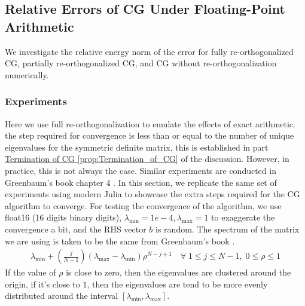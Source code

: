 \documentclass[]{article}
\theoremstyle{definition}
\begin{document}
    \subsection{Relative Errors of CG Under Floating-Point Arithmetic}
        We investigate the relative energy norm of the error for fully re-orthogonalized CG, partially re-orthogonalized CG, and CG without re-orthogonalization numerically. 
        \subsubsection{Experiments}
        Here we use full re-orthogonalization to emulate the effects of exact arithmetic. the step required for convergence is less than or equal to the number of unique eigenvalues for the symmetric definite matrix, this is established in part \hyperref[prop:Termination_of_CG]{Termination of CG \ref*{prop:Termination_of_CG}} of the discussion. However, in practice, this is not always the case. Similar experiments are conducted in Greenbaum's book chapter 4 \cite{book:greenbaum}. In this section, we replicate the same set of experiments using modern Julia to showcase the extra steps required for the CG algorithm to converge. For testing the convergence of the algorithm, we use float16 (16 digits binary digits), $\lambda_{\min} = 1e-4, \lambda_{\max} = 1$ to exaggerate the convergence a bit, and the RHS vector $b$ is random. The spectrum of the matrix we are using is taken to be the same from Greenbaum's book \cite{book:greenbaum}. 
        \begin{align}\label{eqn:paramaterized_experiment_matrix}
            \lambda_{\min} + \left(
                \frac{j}{N - 1}
            \right)(\lambda_{\max} - \lambda_{\min})\rho^{N - j + 1}\quad \forall\; 1 \le j \le N - 1, \; 0 \le \rho \le 1
        \end{align}
        If the value of $\rho$ is close to zero, then the eigenvalues are clustered around the origin, if it's close to $1$, then the eigenvalues are tend to be more evenly distributed around the interval $[\lambda_{\min}, \lambda_{\max}]$. 
\end{document}
